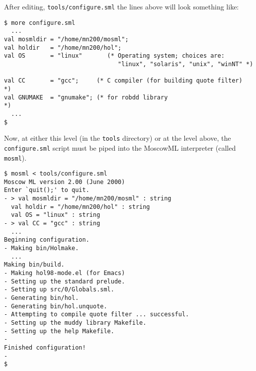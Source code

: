 After editing, \texttt{tools/configure.sml} the lines above will look
something like:

\begin{session}
\begin{verbatim}
$ more configure.sml
  ...
val mosmldir = "/home/mn200/mosml";
val holdir   = "/home/mn200/hol";
val OS       = "linux"       (* Operating system; choices are:
                                "linux", "solaris", "unix", "winNT" *)

val CC       = "gcc";     (* C compiler (for building quote filter)        *)
val GNUMAKE  = "gnumake"; (* for robdd library                             *)
  ...
$
\end{verbatim}
\end{session}

\noindent Now, at either this level (in the \texttt{tools} directory)
or at the level above, the \texttt{configure.sml} script must be piped
into the MoscowML interpreter (called \texttt{mosml}).

\begin{session}
\begin{verbatim}
$ mosml < tools/configure.sml
Moscow ML version 2.00 (June 2000)
Enter `quit();' to quit.
- > val mosmldir = "/home/mn200/mosml" : string
  val holdir = "/home/mn200/hol" : string
  val OS = "linux" : string
- > val CC = "gcc" : string
  ...
Beginning configuration.
- Making bin/Holmake.
  ...
Making bin/build.
- Making hol98-mode.el (for Emacs)
- Setting up the standard prelude.
- Setting up src/0/Globals.sml.
- Generating bin/hol.
- Generating bin/hol.unquote.
- Attempting to compile quote filter ... successful.
- Setting up the muddy library Makefile.
- Setting up the help Makefile.
-
Finished configuration!
-
$
\end{verbatim}
\end{session}



